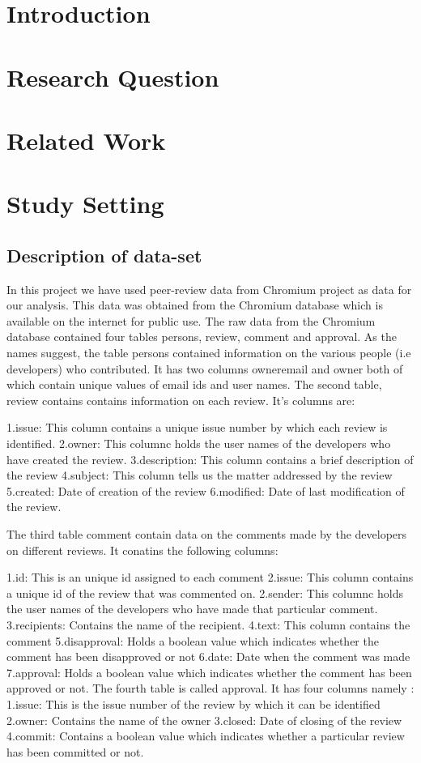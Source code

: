 \documentclass{article}
\begin{document}
\section{Introduction}

\section{Research Question}

\section{Related Work}

\section{Study Setting}

\subsection{Description of data-set}
In this project we have used peer-review data from Chromium project as data for our analysis. This data was obtained from the Chromium database which is available on the internet for public use.
The raw data from the Chromium database contained four tables persons, review, comment and approval. As the names suggest, the table persons contained information on the various people (i.e developers) who contributed. It has two columns owneremail and owner both of which contain unique values of email ids and user names. The second table, review contains contains information on each review. It's columns are:

1.issue: This column contains a unique issue number by which each review is identified.
2.owner: This columnc holds the user names of the developers who have created the review.
3.description: This column contains a brief description of the review
4.subject: This column tells us the matter addressed by the review
5.created: Date of creation of the review
6.modified: Date of last modification of the review.


The third table comment contain data on the comments made by the developers on different reviews. It conatins the following columns:

1.id: This is an unique id assigned to each comment 
2.issue: This column contains a unique id of the review that was commented on.
2.sender: This columnc holds the user names of the developers who have made that particular comment.
3.recipients: Contains the name of the recipient.
4.text: This column contains the comment
5.disapproval: Holds a boolean value which indicates whether the comment has been disapproved or not 
6.date: Date when the comment was made
7.approval: Holds a boolean value which indicates whether the comment has been approved or not.
The fourth table is called approval. It has four columns namely :
1.issue: This is the issue number of the review by which it can be identified
2.owner: Contains the name of the owner
3.closed: Date of closing of the review
4.commit: Contains a boolean value which indicates whether a particular review has been committed or not.
\end{document}

